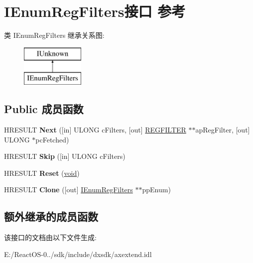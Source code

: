 \hypertarget{interface_i_enum_reg_filters}{}\section{I\+Enum\+Reg\+Filters接口 参考}
\label{interface_i_enum_reg_filters}
类 I\+Enum\+Reg\+Filters 继承关系图\+:\begin{figure}[H]
\begin{center}
\leavevmode
\includegraphics[height=2.000000cm]{interface_i_enum_reg_filters}
\end{center}
\end{figure}
\subsection*{Public 成员函数}
\begin{DoxyCompactItemize}
\item 
\mbox{\label{interface_i_enum_reg_filters_a84ec19893a59ad615930fb88f973b3c3}} 
H\+R\+E\+S\+U\+LT {\bfseries Next} (\mbox{[}in\mbox{]} U\+L\+O\+NG c\+Filters, \mbox{[}out\mbox{]} \hyperlink{struct_r_e_g_f_i_l_t_e_r}{R\+E\+G\+F\+I\+L\+T\+ER} $\ast$$\ast$ap\+Reg\+Filter, \mbox{[}out\mbox{]} U\+L\+O\+NG $\ast$pc\+Fetched)
\item 
\mbox{\label{interface_i_enum_reg_filters_a36282fdcc67af293b4c63071b1ef50c5}} 
H\+R\+E\+S\+U\+LT {\bfseries Skip} (\mbox{[}in\mbox{]} U\+L\+O\+NG c\+Filters)
\item 
\mbox{\label{interface_i_enum_reg_filters_aa32bc5f334b6437aa8505d5ff21d46e6}} 
H\+R\+E\+S\+U\+LT {\bfseries Reset} (\hyperlink{interfacevoid}{void})
\item 
\mbox{\label{interface_i_enum_reg_filters_a7344ec67148d7503b8ca08261f0abd8d}} 
H\+R\+E\+S\+U\+LT {\bfseries Clone} (\mbox{[}out\mbox{]} \hyperlink{interface_i_enum_reg_filters}{I\+Enum\+Reg\+Filters} $\ast$$\ast$pp\+Enum)
\end{DoxyCompactItemize}
\subsection*{额外继承的成员函数}


该接口的文档由以下文件生成\+:\begin{DoxyCompactItemize}
\item 
E\+:/\+React\+O\+S-\/0../sdk/include/dxsdk/axextend.\+idl\end{DoxyCompactItemize}
